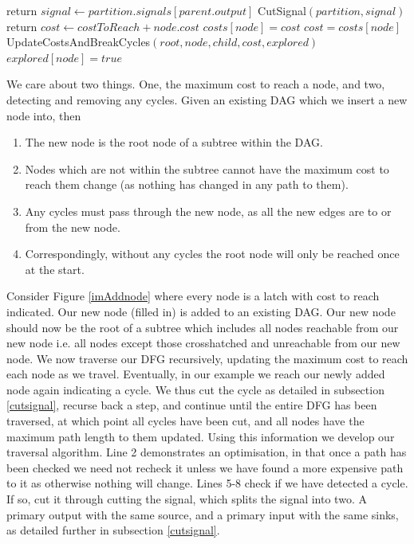\documentclass[12pt,final,oneside]{dwThesis} %
\begin{document}
\begin{algorithm}
\begin{algorithmic}[1]
         \State return
         \EndIf
          
         \State $signal \gets partition.signals[parent.output]$ 
         \State CutSignal$(partition, signal)$
         \State return
         \EndIf
         \State $cost \gets costToReach+node.cost$
         \State $costs[node] = cost$
         \Else
         \State $cost = costs[node]$
         \EndIf
         \State UpdateCostsAndBreakCycles$(root, node, child, cost, explored)$
         \EndFor
         \State $explored[node] = true$
         \EndProcedure
      \end{algorithmic}
   \end{algorithm}
   We care about two things. One, the maximum cost to reach a node, and two, detecting and removing any cycles.
   Given an existing \ac{DAG} which we insert a new node into, then
   \begin{enumerate}
      \item The new node is the root node of a subtree within the \ac{DAG}.
      \item Nodes which are not within the subtree cannot have the maximum cost to reach them change (as nothing has changed in any path to them).
      \item Any cycles must pass through the new node, as all the new edges are to or from the new node.
      \item Correspondingly, without any cycles the root node will only be reached once at the start.
   \end{enumerate}
   Consider Figure \ref{imAddnode} where every node is a latch with cost to reach indicated. Our new node (filled in) is added to an existing \ac{DAG}. Our new node should now be the root of a subtree which includes all nodes reachable from our new node i.e. all nodes except those crosshatched and unreachable from our new node.
   We now traverse our \ac{DFG} recursively, updating the maximum cost to reach each node as we travel. Eventually, in our example we reach our newly added node again indicating a cycle. We thus cut the cycle as detailed in subsection \ref{cutsignal}, recurse back a step, and continue until the entire \ac{DFG} has been traversed, at which point all cycles have been cut, and all nodes have the maximum path length to them updated.
   Using this information we develop our traversal algorithm.
   Line 2 demonstrates an optimisation, in that once a path has been checked we need not recheck it unless we have found a more expensive path to it as otherwise nothing will change.
   Lines 5-8 check if we have detected a cycle. If so, cut it through cutting the signal, which splits the signal into two. A primary output with the same source, and a primary input with the same sinks, as detailed further in subsection \ref{cutsignal}.
\end{document}
